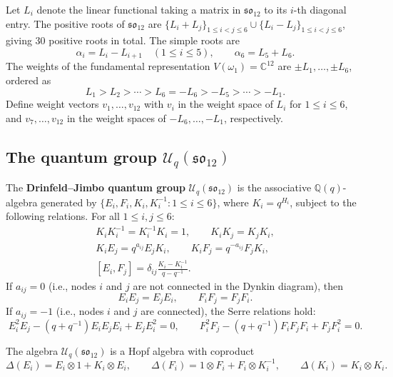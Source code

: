 \documentclass{ximera}
\newcommand{\C}{\mathbb{C}}
\newcommand{\so}{\mathfrak{so}}
\newcommand{\Uq}{\mathcal{U}_q}
\begin{document}
Let $L_i$ denote the linear functional taking a matrix in $\so_{12}$ to its $i$-th diagonal entry. The positive roots of $\so_{12}$ are $\{L_i + L_j\}_{1 \leq i < j \leq 6} \cup \{L_i - L_j\}_{1 \leq i < j \leq 6}$, giving 30 positive roots in total. The simple roots are
$$\alpha_i = L_i - L_{i+1} \quad (1 \leq i \leq 5), \qquad \alpha_6 = L_5 + L_6.$$
The weights of the fundamental representation $V(\omega_1) = \C^{12}$ are $\pm L_1, \ldots, \pm L_6$, ordered as
\[
    L_1 > L_2 > \cdots > L_6 = -L_6 > -L_5 > \cdots > -L_1.
\]
Define weight vectors $v_1, \ldots, v_{12}$ with $v_i$ in the weight space of $L_i$ for $1 \leq i \leq 6$, and $v_{7}, \ldots, v_{12}$ in the weight spaces of $-L_6, \ldots, -L_1$, respectively.

\subsection{The quantum group $\Uq(\so_{12})$}

The \textbf{Drinfeld--Jimbo quantum group} $\Uq(\so_{12})$ is the associative $\mathbb{Q}(q)$-algebra generated by $\{E_i, F_i, K_i, K_i^{-1} : 1 \leq i \leq 6\}$, where $K_i = q^{H_i}$, subject to the following relations. For all $1 \leq i, j \leq 6$:
\begin{gather}
    K_i K_i^{-1} = K_i^{-1} K_i = 1, \qquad K_i K_j = K_j K_i, \label{eq:KK} \\
    K_i E_j = q^{a_{ij}} E_j K_i, \qquad K_i F_j = q^{-a_{ij}} F_j K_i, \label{eq:KEF} \\
    [E_i, F_j] = \delta_{ij} \frac{K_i - K_i^{-1}}{q - q^{-1}}. \label{eq:EF}
\end{gather}
If $a_{ij} = 0$ (i.e., nodes $i$ and $j$ are not connected in the Dynkin diagram), then
\begin{equation}\label{eq:commute}
    E_i E_j = E_j E_i, \qquad F_i F_j = F_j F_i.
\end{equation}
If $a_{ij} = -1$ (i.e., nodes $i$ and $j$ are connected), the Serre relations hold:
\begin{equation}\label{eq:Serre}
    E_i^2 E_j - (q + q^{-1}) E_i E_j E_i + E_j E_i^2 = 0, \qquad F_i^2 F_j - (q + q^{-1}) F_i F_j F_i + F_j F_i^2 = 0.
\end{equation}

The algebra $\Uq(\so_{12})$ is a Hopf algebra with coproduct
\begin{equation}\label{eq:coprod}
    \Delta(E_i) = E_i \otimes 1 + K_i \otimes E_i, \qquad \Delta(F_i) = 1 \otimes F_i + F_i \otimes K_i^{-1}, \qquad \Delta(K_i) = K_i \otimes K_i.
\end{equation}
\end{document}
